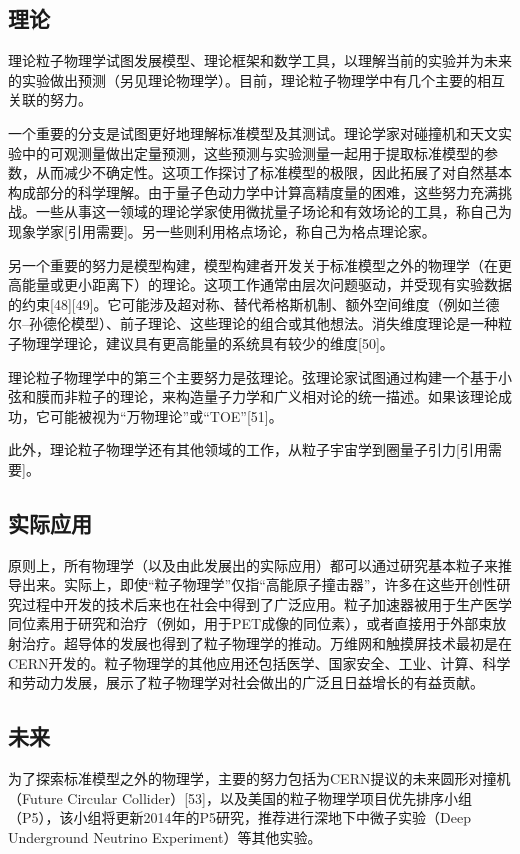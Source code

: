 \subsection{理论}
理论粒子物理学试图发展模型、理论框架和数学工具，以理解当前的实验并为未来的实验做出预测（另见理论物理学）。目前，理论粒子物理学中有几个主要的相互关联的努力。

一个重要的分支是试图更好地理解标准模型及其测试。理论学家对碰撞机和天文实验中的可观测量做出定量预测，这些预测与实验测量一起用于提取标准模型的参数，从而减少不确定性。这项工作探讨了标准模型的极限，因此拓展了对自然基本构成部分的科学理解。由于量子色动力学中计算高精度量的困难，这些努力充满挑战。一些从事这一领域的理论学家使用微扰量子场论和有效场论的工具，称自己为现象学家[引用需要]。另一些则利用格点场论，称自己为格点理论家。

另一个重要的努力是模型构建，模型构建者开发关于标准模型之外的物理学（在更高能量或更小距离下）的理论。这项工作通常由层次问题驱动，并受现有实验数据的约束[48][49]。它可能涉及超对称、替代希格斯机制、额外空间维度（例如兰德尔–孙德伦模型）、前子理论、这些理论的组合或其他想法。消失维度理论是一种粒子物理学理论，建议具有更高能量的系统具有较少的维度[50]。

理论粒子物理学中的第三个主要努力是弦理论。弦理论家试图通过构建一个基于小弦和膜而非粒子的理论，来构造量子力学和广义相对论的统一描述。如果该理论成功，它可能被视为“万物理论”或“TOE”[51]。

此外，理论粒子物理学还有其他领域的工作，从粒子宇宙学到圈量子引力[引用需要]。
\subsection{实际应用}
原则上，所有物理学（以及由此发展出的实际应用）都可以通过研究基本粒子来推导出来。实际上，即使“粒子物理学”仅指“高能原子撞击器”，许多在这些开创性研究过程中开发的技术后来也在社会中得到了广泛应用。粒子加速器被用于生产医学同位素用于研究和治疗（例如，用于PET成像的同位素），或者直接用于外部束放射治疗。超导体的发展也得到了粒子物理学的推动。万维网和触摸屏技术最初是在CERN开发的。粒子物理学的其他应用还包括医学、国家安全、工业、计算、科学和劳动力发展，展示了粒子物理学对社会做出的广泛且日益增长的有益贡献。
\subsection{未来}
为了探索标准模型之外的物理学，主要的努力包括为CERN提议的未来圆形对撞机（Future Circular Collider）[53]，以及美国的粒子物理学项目优先排序小组（P5），该小组将更新2014年的P5研究，推荐进行深地下中微子实验（Deep Underground Neutrino Experiment）等其他实验。
